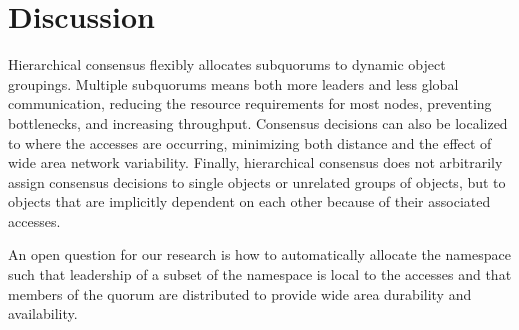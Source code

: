\documentclass[11pt,letterpaper]{article}
\begin{document}
\section{Discussion}

Hierarchical consensus flexibly allocates subquorums to dynamic object groupings.
Multiple subquorums means both more leaders and less global communication, reducing the
resource requirements for most nodes, preventing bottlenecks, and increasing throughput.
Consensus decisions can also be localized to where the accesses are occurring,
minimizing both distance and the effect of wide area network variability.
Finally, hierarchical consensus does not arbitrarily assign consensus decisions to single
objects or unrelated groups of objects, but to objects that are implicitly dependent on
each other because of their associated accesses.

An open question for our research is how to automatically allocate the namespace such that
leadership of a subset of the namespace is local to the accesses and that members of the
quorum are distributed to provide wide area durability and availability.



\end{document}
